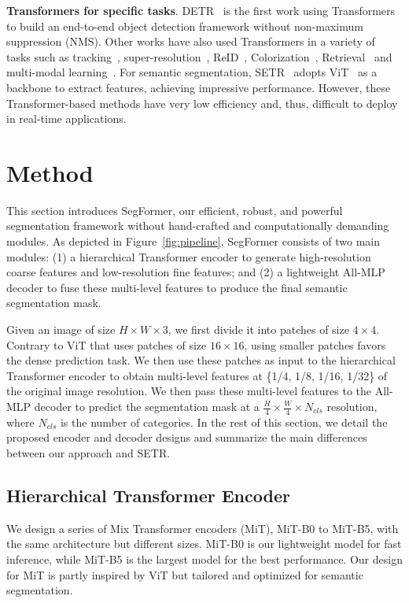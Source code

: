 \textbf{Transformers for specific tasks}. DETR~\cite{DETR} is the first work using Transformers to build an end-to-end object detection framework without non-maximum suppression (NMS). Other works have also used Transformers in a variety of tasks such as tracking~\cite{transtrack,trackformer}, super-resolution~\cite{chen2020pre}, ReID~\cite{transreid}, Colorization~\cite{kumar2021colorization}, Retrieval~\cite{el2021training} and multi-modal learning~\cite{clip,unit}. For semantic segmentation, SETR~\cite{setr} adopts ViT~\cite{vit} as a backbone to extract features, achieving impressive performance. However, these Transformer-based methods have very low efficiency and, thus, difficult to deploy in real-time applications. 

\section{Method}

This section introduces SegFormer, our efficient, robust, and powerful segmentation framework without hand-crafted and computationally demanding modules. As depicted in Figure~\ref{fig:pipeline}, SegFormer consists of two main modules: (1) a hierarchical Transformer encoder to generate high-resolution coarse features and low-resolution fine features; and (2) a lightweight All-MLP decoder to fuse these multi-level features to produce the final semantic segmentation mask.

Given an image of size $H \times W \times 3$, we first divide it into patches of size $4\times 4$. Contrary to ViT that uses patches of size $16\times 16$, using smaller patches favors the dense prediction task. We then use these patches as input to the hierarchical Transformer encoder to obtain multi-level features at \{1/4, 1/8, 1/16, 1/32\} of the original image resolution. We then pass these multi-level features to the All-MLP decoder to predict the segmentation mask at a $\frac{H}{4} \times \frac{W}{4} \times N_{cls}$ resolution, where $N_{cls}$ is the number of categories. In the rest of this section, we detail the proposed encoder and decoder designs and summarize the main differences between our approach and SETR.

\subsection{Hierarchical Transformer Encoder} We design a series of Mix Transformer encoders (MiT), MiT-B0 to MiT-B5,  with the same architecture but different sizes. MiT-B0 is our lightweight model for fast inference, while MiT-B5 is the largest model for the best performance. Our design for MiT is partly inspired by ViT but tailored and optimized for semantic segmentation.

